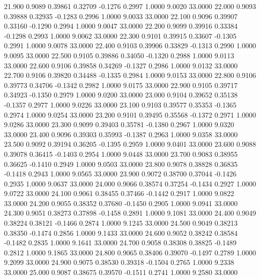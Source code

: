   21.900   0.9089   0.39861   0.32709  -0.1276   0.2997   1.0000   9.0020  33.0000
  22.000   0.9093   0.39888   0.32935  -0.1283   0.2996   1.0000   9.0033  33.0000
  22.100   0.9096   0.39907   0.33160  -0.1290   0.2994   1.0000   9.0047  33.0000
  22.200   0.9099   0.39916   0.33384  -0.1298   0.2993   1.0000   9.0062  33.0000
  22.300   0.9101   0.39915   0.33607  -0.1305   0.2991   1.0000   9.0078  33.0000
  22.400   0.9103   0.39906   0.33829  -0.1313   0.2990   1.0000   9.0095  33.0000
  22.500   0.9105   0.39886   0.34050  -0.1320   0.2988   1.0000   9.0113  33.0000
  22.600   0.9106   0.39858   0.34269  -0.1327   0.2986   1.0000   9.0132  33.0000
  22.700   0.9106   0.39820   0.34488  -0.1335   0.2984   1.0000   9.0153  33.0000
  22.800   0.9106   0.39773   0.34706  -0.1342   0.2982   1.0000   9.0175  33.0000
  22.900   0.9105   0.39717   0.34923  -0.1350   0.2979   1.0000   9.0200  33.0000
  23.000   0.9104   0.39652   0.35138  -0.1357   0.2977   1.0000   9.0226  33.0000
  23.100   0.9103   0.39577   0.35353  -0.1365   0.2974   1.0000   9.0254  33.0000
  23.200   0.9101   0.39495   0.35568  -0.1372   0.2971   1.0000   9.0286  33.0000
  23.300   0.9099   0.39403   0.35781  -0.1380   0.2967   1.0000   9.0320  33.0000
  23.400   0.9096   0.39303   0.35993  -0.1387   0.2963   1.0000   9.0358  33.0000
  23.500   0.9092   0.39194   0.36205  -0.1395   0.2959   1.0000   9.0401  33.0000
  23.600   0.9088   0.39078   0.36415  -0.1403   0.2954   1.0000   9.0448  33.0000
  23.700   0.9083   0.38955   0.36625  -0.1410   0.2949   1.0000   9.0503  33.0000
  23.800   0.9078   0.38828   0.36835  -0.1418   0.2943   1.0000   9.0565  33.0000
  23.900   0.9072   0.38700   0.37044  -0.1426   0.2935   1.0000   9.0637  33.0000
  24.000   0.9066   0.38574   0.37254  -0.1434   0.2927   1.0000   9.0722  33.0000
  24.100   0.9061   0.38455   0.37466  -0.1442   0.2917   1.0000   9.0822  33.0000
  24.200   0.9055   0.38352   0.37680  -0.1450   0.2905   1.0000   9.0941  33.0000
  24.300   0.9051   0.38273   0.37898  -0.1458   0.2891   1.0000   9.1081  33.0000
  24.400   0.9049   0.38224   0.38121  -0.1466   0.2874   1.0000   9.1245  33.0000
  24.500   0.9049   0.38213   0.38350  -0.1474   0.2856   1.0000   9.1433  33.0000
  24.600   0.9052   0.38242   0.38584  -0.1482   0.2835   1.0000   9.1641  33.0000
  24.700   0.9058   0.38308   0.38825  -0.1489   0.2812   1.0000   9.1865  33.0000
  24.800   0.9065   0.38406   0.39070  -0.1497   0.2789   1.0000   9.2099  33.0000
  24.900   0.9075   0.38530   0.39318  -0.1504   0.2765   1.0000   9.2338  33.0000
  25.000   0.9087   0.38675   0.39570  -0.1511   0.2741   1.0000   9.2580  33.0000
